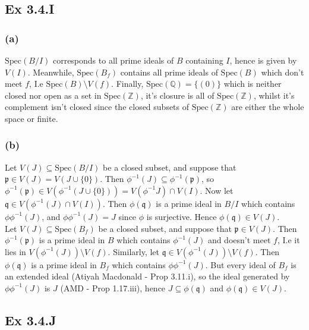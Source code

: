 \documentclass{article}
\theoremstyle{definition}
\newcommand{\Z}{\mathbb{Z}}
\newcommand{\Q}{\mathbb{Q}}
\newcommand{\Spec}{\text{Spec}}
\begin{document}
\subsection*{Ex 3.4.I}

\subsubsection*{(a)}

$\Spec(B/I)$ corresponds to all prime ideals of $B$ containing $I$, hence is
given by $V(I)$. Meanwhile, $\Spec(B_f)$ contains all prime ideals of
$\Spec(B)$ which don't meet $f$, I.e $\Spec(B) \setminus V(f)$. Finally,
$\Spec(\Q) = \{(0)\}$ which is neither closed nor open as a set in $\Spec(\Z)$,
it's closure is all of $\Spec(\Z)$, whilst it's complement isn't closed since
the closed subsets of $\Spec(\Z)$ are either the whole space or finite.

\subsubsection*{(b)}

Let $V(J) \subseteq \Spec(B/I)$ be a closed subset, and suppose that
$\mathfrak{p} \in V(J) = V(J \cup \{0\})$. Then $\phi^{-1}(J) \subseteq
\phi^{-1}(\mathfrak{p})$, so $\phi^{-1}(\mathfrak{p}) \in V(\phi^{-1}(J \cup
\{0\})) = V(\phi^{-1}J) \cap V(I)$. Now let $\mathfrak{q} \in V(\phi^{-1}(J)
\cap V(I))$. Then $\phi(\mathfrak{q})$ is a prime ideal in $B/I$ which contains
$\phi\phi^{-1}(J)$, and $\phi\phi^{-1}(J) = J$ since $\phi$ is surjective. Hence 
$\phi(\mathfrak{q}) \in V(J)$. \\

Let $V(J) \subseteq \Spec(B_f)$ be a closed subset, and suppose that
$\mathfrak{p} \in V(J)$. Then $\phi^{-1}(\mathfrak{p})$ is a prime ideal in $B$
which contains $\phi^{-1}(J)$ and doesn't meet $f$, I.e it lies in
$V(\phi^{-1}(J)) \setminus V(f)$. Similarly, let $\mathfrak{q} \in
V(\phi^{-1}(J)) \setminus V(f)$. Then $\phi(\mathfrak{q})$ is a prime ideal in
$B_f$ which contains $\phi\phi^{-1}(J)$. But every ideal of $B_f$ is an
extended ideal (Atiyah Macdonald - Prop 3.11.i), so the ideal generated by
$\phi\phi^{-1}(J)$ is $J$ (AMD - Prop 1.17.iii), hence $J \subseteq
\phi(\mathfrak{q})$ and $\phi(\mathfrak{q}) \in V(J)$.

\subsection*{Ex 3.4.J}
\end{document}
